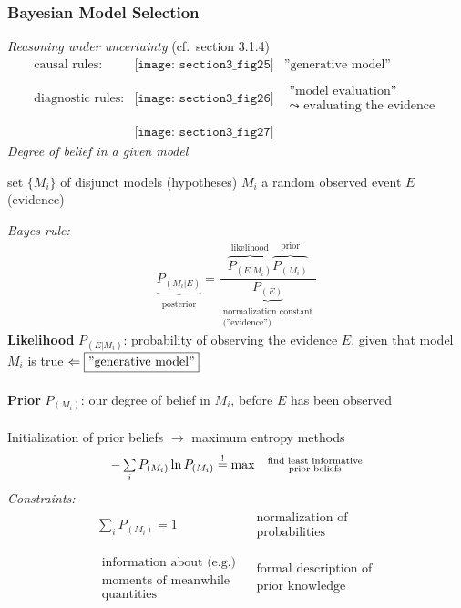 \subsubsection{Bayesian Model Selection}
\emph{Reasoning under uncertainty} (cf.\ section 3.1.4)
\[ \begin{array}{lcl}
	\text{causal rules:}
	& \texttt{[image: section3\_fig25]} 
	& \text{''generative model''} \\\\
	\text{diagnostic rules:}
	& \texttt{[image: section3\_fig26]}
	& \substack{ 	\text{''model evaluation''} \\
			\leadsto \text{ evaluating the evidence}} \\\\
	& \texttt{[image: section3\_fig27]}
\end{array} \]
\emph{Degree of belief in a given model}
\begin{itemize}
	\itl set $\{ M_i \}$ of disjunct models (hypotheses) $M_i$
	\itl a random observed event $E$ (evidence)
\end{itemize}
\emph{Bayes rule:}
\begin{equation}
	\underbrace{ P_{(M_i|E)} }_{\substack{\text{posterior}}}
	= \frac{ \overbrace{ P_{(E|M_i)} }^{ \substack{ \text{likelihood}}}
	\overbrace{ P_{(M_i)} }^{\substack{\text{prior}}}
	}{ \underbrace{ P_{(E)} }_{\substack{\text{normalization constant}\\
		\text{(''evidence'')}}} }
\end{equation}
\textbf{Likelihood} $P_{(E|M_i)}$: probability of observing the evidence $E$, given that model $M_i$ is true $\Leftarrow \fbox{\text{''generative model''}}$
\\\\
\textbf{Prior} $P_{(M_i)}$: our degree of belief in $M_i$, before $E$ has been observed
\\\\
Initialization of prior beliefs $\rightarrow$ maximum entropy methods
\begin{equation}
	\begin{array}{lc}
	-\sum\limits_i P_{(M_i)} \ln P_{(M_i)} \stackrel{\mathrm{!}}{=} \max
	& \substack{ 	\text{find least informative} \\
			\text{prior beliefs}}
	\end{array}
\end{equation}
\emph{Constraints:}
\begin{equation}
	\begin{array}{lc}
	\sum\limits_i P_{(M_i)} = 1 
	& 
	\substack{	\text{normalization of} \\
			\text{probabilities}} \\\\
	\substack{ 	\text{information about (e.g.)} \\
			\text{moments of meanwhile} \\
			\text{quantities} }
	& \substack{ 	\text{formal description of} \\
			\text{prior knowledge}}
	\end{array}
\end{equation}
